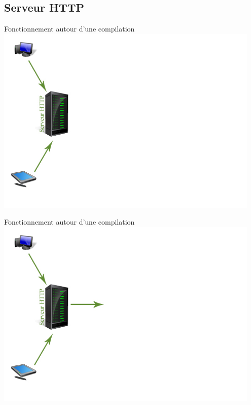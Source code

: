 \documentclass{beamer}
\begin{document}
\subsection{Serveur HTTP}
\begin{frame}{Fonctionnement autour d'une compilation}
 	\includegraphics[width=0.95\textwidth]{./images/step1}
\end{frame}
\begin{frame}{Fonctionnement autour d'une compilation}
 	\includegraphics[width=0.95\textwidth]{./images/step2}
\end{frame}
\end{document}
